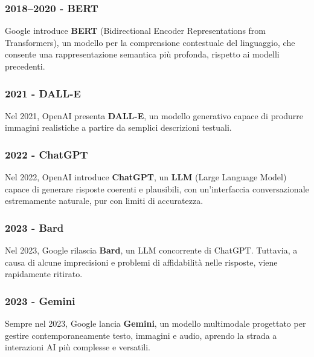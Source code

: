 \subsubsection{2018–2020 - BERT}

Google introduce \textbf{BERT} (Bidirectional Encoder Representations from Transformers), un modello per la comprensione contestuale del linguaggio, che consente una rappresentazione semantica più profonda, rispetto ai modelli precedenti.

\subsubsection{2021 - DALL-E}

Nel 2021, OpenAI presenta \textbf{DALL-E}, un modello generativo capace di produrre immagini realistiche a partire da semplici descrizioni testuali.

\subsubsection{2022 - ChatGPT}

Nel 2022, OpenAI introduce \textbf{ChatGPT}, un \textbf{LLM} (Large Language Model) capace di generare risposte coerenti e plausibili, con un’interfaccia conversazionale estremamente naturale, pur con limiti di accuratezza.

\subsubsection{2023 - Bard}

Nel 2023, Google rilascia \textbf{Bard}, un LLM concorrente di ChatGPT. Tuttavia, a causa di alcune imprecisioni e problemi di affidabilità nelle risposte, viene rapidamente ritirato.

\subsubsection{2023 - Gemini}

Sempre nel 2023, Google lancia \textbf{Gemini}, un modello multimodale progettato per gestire contemporaneamente testo, immagini e audio, aprendo la strada a interazioni AI più complesse e versatili.

